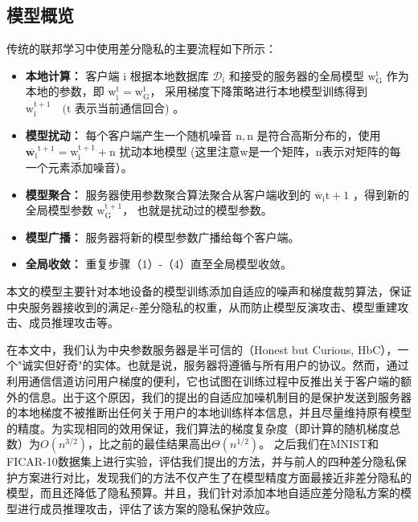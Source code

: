 \subsection{模型概览}
传统的联邦学习中使用差分隐私的主要流程如下所示：
\begin{itemize}
\item \textbf{本地计算：}
客户端 $\mathrm{i}$ 根据本地数据库 $\mathcal{D}_{\mathrm{i}}$ 和接受的服务器的全局模型 $\mathrm{w}_{\mathrm{G}}^{\mathrm{t}}$ 作为本地的参数，即 $\mathrm{w}_{\mathrm{i}}^{\mathrm{t}}=\mathrm{w}_{\mathrm{G}}^{\mathrm{t}}$， 采用梯度下降策略进行本地模型训练得到 $\mathrm{w}_{\mathrm{i}}^{\mathrm{t}+1} \quad(\mathrm{t}$ 表示当前通信回合) 。

\item \textbf{模型扰动：}
每个客户端产生一个随机噪音 $\mathrm{n},\mathrm{n}$ 是符合高斯分布的，使用 $\overline{\mathbf{w}_{\mathrm{i}}}^{\mathrm{t}+1}=\mathrm{w}_{\mathrm{i}}^{\mathrm{t}+1}+\mathrm{n}$ 扰动本地模型 (这里注意w是一个矩阵，n表示对矩阵的每一个元素添加噪音）。

\item \textbf{模型聚合：}
服务器使用参数聚合算法聚合从客户端收到的 $\overline{\mathrm{w}}_{\mathrm{i}} \mathrm{t}+1$ ，得到新的全局模型参数 $\mathrm{w}_{\mathrm{G}}^{\mathrm{t}+1}$， 也就是扰动过的模型参数。

\item \textbf{模型广播：}
服务器将新的模型参数广播给每个客户端。

\item \textbf{全局收敛：}
重复步骤（1）-（4）直至全局模型收敛。
\end{itemize}

本文的模型主要针对本地设备的模型训练添加自适应的噪声和梯度裁剪算法，保证中央服务器接收到的满足$\epsilon$-差分隐私的权重，从而防止模型反演攻击、模型重建攻击、成员推理攻击等。

在本文中，我们认为中央参数服务器是半可信的（Honest but Curious, HbC），一个"诚实但好奇"的实体。也就是说，服务器将遵循与所有用户的协议。然而，通过利用通信信道访问用户梯度的便利，它也试图在训练过程中反推出关于客户端的额外的信息。出于这个原因，我们的提出的自适应加噪机制目的是保护发送到服务器的本地梯度不被推断出任何关于用户的本地训练样本信息，并且尽量维持原有模型的精度。为实现相同的效用保证，我们算法的梯度复杂度（即计算的随机梯度总数）为$O\left(n^{3 / 2}\right)$，比之前的最佳结果高出$\Theta\left(n^{1 / 2}\right)$。 之后我们在MNIST和FICAR-10数据集上进行实验，评估我们提出的方法，并与前人的四种差分隐私保护方案进行对比，发现我们的方法不仅产生了在模型精度方面最接近非差分隐私的模型，而且还降低了隐私预算。并且，我们针对添加本地自适应差分隐私方案的模型进行成员推理攻击，评估了该方案的隐私保护效应。

